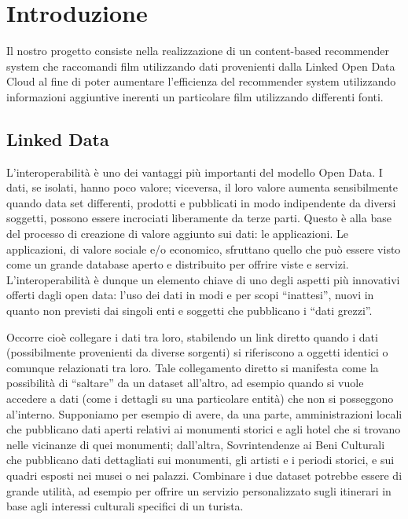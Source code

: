 \section{Introduzione}

Il nostro progetto consiste nella realizzazione di un content-based recommender system che raccomandi film utilizzando dati provenienti dalla Linked Open Data Cloud al fine di poter aumentare l'efficienza del recommender system utilizzando informazioni aggiuntive inerenti un particolare film utilizzando differenti fonti.

\subsection{Linked Data}
L’interoperabilità è uno dei vantaggi più importanti del modello Open Data. I dati, se isolati, hanno poco valore; viceversa, il loro valore aumenta sensibilmente quando data set differenti, prodotti e pubblicati in modo indipendente da diversi soggetti, possono essere incrociati liberamente da terze parti. Questo è alla base del processo di creazione di valore aggiunto sui dati: le applicazioni. Le applicazioni, di valore sociale e/o economico, sfruttano quello che può essere visto come un grande database aperto e distribuito per offrire viste e servizi. L’interoperabilità è dunque un elemento chiave di uno degli aspetti più innovativi offerti dagli open data: l’uso dei dati in modi e per scopi “inattesi”, nuovi in quanto non previsti dai singoli enti e soggetti che pubblicano i “dati grezzi”.

Occorre cioè collegare i dati tra loro, stabilendo un link diretto quando i dati (possibilmente provenienti da diverse sorgenti) si riferiscono a oggetti identici o comunque relazionati tra loro. Tale collegamento diretto si manifesta come la possibilità di “saltare” da un dataset all’altro, ad esempio quando si vuole accedere a dati (come i dettagli su una particolare entità) che non si posseggono al’interno.
Supponiamo per esempio di avere, da una parte, amministrazioni locali che pubblicano dati aperti relativi ai monumenti storici e agli hotel che si trovano nelle vicinanze di quei monumenti; dall’altra, Sovrintendenze ai Beni Culturali che pubblicano dati dettagliati sui monumenti, gli artisti e i periodi storici, e sui quadri esposti nei musei o nei palazzi.
Combinare i due dataset potrebbe essere di grande utilità, ad esempio per offrire un servizio personalizzato sugli itinerari in base agli interessi culturali specifici di un turista.


